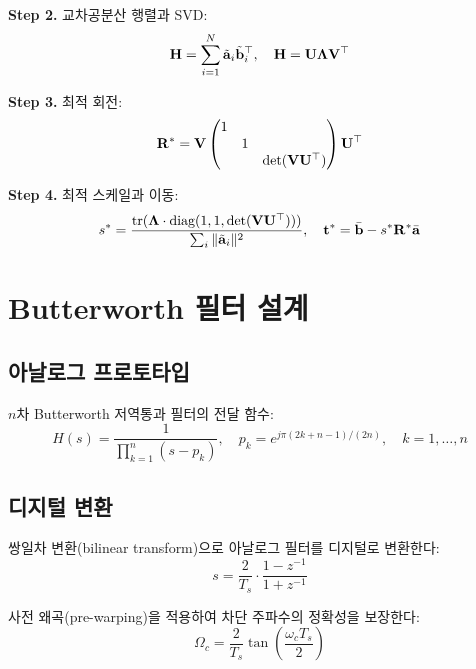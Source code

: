 \documentclass[11pt, a4paper]{report}
\begin{document}
\textbf{Step 2.} 교차공분산 행렬과 SVD:
\begin{equation}
  \mathbf{H} = \sum_{i=1}^{N} \tilde{\mathbf{a}}_i \tilde{\mathbf{b}}_i^\top, \quad
  \mathbf{H} = \mathbf{U}\bm{\Lambda}\mathbf{V}^\top
\end{equation}

\textbf{Step 3.} 최적 회전:
\begin{equation}
  \mathbf{R}^* = \mathbf{V} \begin{pmatrix} 1 & & \\ & 1 & \\ & & \det(\mathbf{V}\mathbf{U}^\top) \end{pmatrix} \mathbf{U}^\top
\end{equation}

\textbf{Step 4.} 최적 스케일과 이동:
\begin{equation}
  s^* = \frac{\text{tr}(\bm{\Lambda} \cdot \text{diag}(1,1,\det(\mathbf{V}\mathbf{U}^\top)))}{\sum_i \|\tilde{\mathbf{a}}_i\|^2}, \quad
  \mathbf{t}^* = \bar{\mathbf{b}} - s^*\mathbf{R}^*\bar{\mathbf{a}}
\end{equation}

\section{Butterworth 필터 설계}

\subsection{아날로그 프로토타입}

$n$차 Butterworth 저역통과 필터의 전달 함수:
\begin{equation}
  H(s) = \frac{1}{\prod_{k=1}^{n} (s - p_k)}, \quad
  p_k = e^{j\pi(2k+n-1)/(2n)}, \quad k = 1, \ldots, n
\end{equation}

\subsection{디지털 변환}

쌍일차 변환(bilinear transform)으로 아날로그 필터를 디지털로 변환한다:
\begin{equation}
  s = \frac{2}{T_s} \cdot \frac{1 - z^{-1}}{1 + z^{-1}}
\end{equation}

사전 왜곡(pre-warping)을 적용하여 차단 주파수의 정확성을 보장한다:
\begin{equation}
  \Omega_c = \frac{2}{T_s} \tan\!\left(\frac{\omega_c T_s}{2}\right)
\end{equation}
\end{document}
